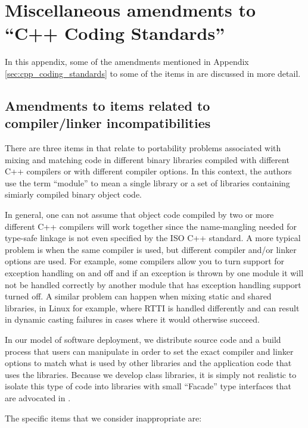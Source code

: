 %
\section{Miscellaneous amendments to ``C++ Coding Standards''}
\label{sec:misc_amendments}
%

In this appendix, some of the amendments mentioned in Appendix
{}\ref{sec:cpp_coding_standards} to some of the items in
{}\cite{C++CodingStandards05} are discussed in more detail.


%
\subsection{Amendments to items related to compiler/linker incompatibilities}
%

There are three items in {}\cite{C++CodingStandards05} that relate to
portability problems associated with mixing and matching code in
different binary libraries compiled with different C++ compilers or
with different compiler options.  In this context, the authors use the
term ``module'' to mean a single library or a set of libraries
containing simiarly compiled binary object code.

In general, one can not assume that object code compiled by two or more
different C++ compilers will work together since the name-mangling needed for
type-safe linkage is not even specified by the ISO C++ standard.  A more
typical problem is when the same compiler is used, but different compiler
and/or linker options are used.  For example, some compilers allow you to turn
support for exception handling on and off and if an exception is thrown by one
module it will not be handled correctly by another module that has exception
handling support turned off.  A similar problem can happen when mixing static
and shared libraries, in Linux for example, where RTTI is handled differently
and can result in dynamic casting failures in cases where it would otherwise
succeed.

In our model of software deployment, we distribute source code and a
build process that users can manipulate in order to set the exact
compiler and linker options to match what is used by other libraries
and the application code that uses the libraries.  Because we develop
class libraries, it is simply not realistic to isolate this type of
code into libraries with small ``Facade'' type interfaces that are
advocated in {}\cite{C++CodingStandards05}.

The specific items that we consider inappropriate are:

